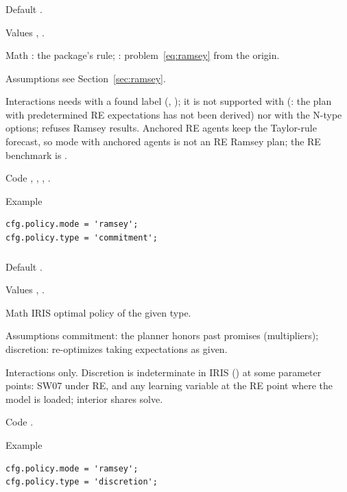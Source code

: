 \documentclass[11pt,a4paper]{article}
\DeclareRobustCommand{\codem}[1]{\texttt{\detokenize{#1}}}
\newenvironment{optspec}%
  {\begin{description}[style=sameline,leftmargin=2.7cm,labelwidth=2.5cm,font=\normalfont\itshape]}%
  {\end{description}}
\begin{document}
\subsubsection{\texorpdfstring{\codem{policy.mode}}{policy.mode}}\label{opt:policy-mode}
\begin{optspec}
  \item[Default] .
  \item[Values] , .
  \item[Math] : the package's rule; : problem~\eqref{eq:ramsey} from
        the origin.
  \item[Assumptions] see Section~\ref{sec:ramsey}.
  \item[Interactions]  needs  with a found label
        (, ); it is not supported with
         (: the plan
        with predetermined RE expectations has not been derived) nor with the N-type options;
         refuses Ramsey results. Anchored RE agents keep the Taylor-rule
        forecast, so mode  with anchored agents is not an RE Ramsey plan; the RE
        benchmark is .
  \item[Code] , , ,
        .
  \item[Example]
\begin{lstlisting}
cfg.policy.mode = 'ramsey';
cfg.policy.type = 'commitment';
\end{lstlisting}
\end{optspec}

\subsubsection{\texorpdfstring{\codem{policy.type}}{policy.type}}\label{opt:policy-type}
\begin{optspec}
  \item[Default] .
  \item[Values] , .
  \item[Math] IRIS optimal policy of the given type.
  \item[Assumptions] commitment: the planner honors past promises (multipliers); discretion:
        re-optimizes taking expectations as given.
  \item[Interactions]  only. Discretion is indeterminate in IRIS
        () at some parameter points: SW07 under RE, and any learning
        variable at the RE point where the model is loaded; interior shares solve.
  \item[Code] .
  \item[Example]
\begin{lstlisting}
cfg.policy.mode = 'ramsey';
cfg.policy.type = 'discretion';
\end{lstlisting}
\end{optspec}
\end{document}
